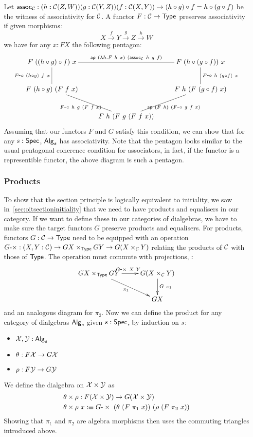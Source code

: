 \documentclass[a4paper,10pt]{article}
\begin{document}
Let
$\mathsf{assoc}_{\mathcal{C}} : (h : \mathcal{C}(Z,W)) (g : \mathcal{C}(Y,Z)) (f : \mathcal{C}(X,Y)) \to (h \circ
g) \circ f = h \circ (g \circ f)$
be the witness of associativity for $\mathcal{C}$. A functor $F : \mathcal{C} \to \mathsf{Type}$
preserves associativity if given morphisms:
$$
X \overset{f}\to Y \overset{g}\to Z \overset{h}\to W
$$
we have for any $x : FX$ the following pentagon:
$$
\xymatrix{
F\ ((h \circ g) \circ f)\ x 
  \ar@{-}[rr]^{\ap\ (\lambda h . F\ h\ x)\ (\assoc_{\C}\ h\ g\ f)} 
  \ar@{-}[d]_{\Fcomp\ (h \circ g)\ f\ x}
&&F\ (h \circ (g \circ f))\ x 
  \ar@{-}[d]^{\Fcomp\ h\ (g \circ f)\ x}
  \\
F\ (h \circ g)\ (F\ f\ x)
  \ar@{-}[dr]_{\Fcomp\ h\ g\ (F\ f\ x)}
&&F\ h\ (F\ (g \circ f)\ x) 
  \ar@{-}[dl]^{\ap\ (F\ h)\ (\Fcomp\ g\ f\ x)}
  \\
&F\ h\ (F\ g\ (F\ f\ x))&
}
$$
Assuming that our functors $F$ and $G$ satisfy this condition, we can
show that for any $s : \mathsf{Spec}$, $\mathsf{Alg}_s$ has associativity. Note that
the pentagon looks similar to the usual pentagonal coherence condition
for associators, in fact, if the functor is a representible functor,
the above diagram is such a pentagon.

\subsubsection{Products}

To show that the section principle is logically equivalent to
initiality, we saw in~\cref{sec:oitsectioninitiality} that we need to
have products and equalisers in our category. If we want to define
these in our categories of dialgebras, we have to make sure the target
functors $G$ preserve products and equalisers. For products, functors
$G : \mathcal{C} \to \mathsf{Type}$ need to be equipped with an operation
$G\mbox{-}\times : (X, Y : \mathcal{C}) \to GX \times_{\mathsf{Type}} GY \to G(X \times_{\mathcal{C}}
Y)$
relating the products of $\mathcal{C}$ with those of $\mathsf{Type}$. The operation
must commute with projections, \ie:
$$
\xymatrix{
GX \times_{\Type} GY 
 \ar[r]^{\Gtimes\ X\ Y} 
 \ar[rd]_{\pi_1}
&G(X \times_{\C} Y)
 \ar[d]^{G\ \pi_1} \\
&GX
}
$$
and an analogous diagram for $\pi_2$. Now we can define the product
for any category of dialgebras $\mathsf{Alg}_s$ given $s : \mathsf{Spec}$, by induction
on $s$:
%
\begin{itemize}
\item $\mathcal{X}, \mathcal{Y} : \mathsf{Alg}_s$
\item $\theta : F \mathcal{X} \to G \mathcal{X}$
\item $\rho : F \mathcal{Y} \to G \mathcal{Y}$
\end{itemize}
%
We define the dialgebra on $\mathcal{X} \times \mathcal{Y}$ as
\begin{align*}
&\theta \times \rho : F (\alg{X} \times \alg{Y}) \to G (\alg{X} \times \alg{Y}) \\
&\theta \times \rho\ x \ddefeq  \Gtimes\ (\theta\ (F\ \pi_1\ x))\ (\rho\ (F\ \pi_2\ x))
\end{align*}
Showing that $\pi_1$ and $\pi_2$ are algebra morphisms then uses the
commuting triangles introduced above.
\end{document}
